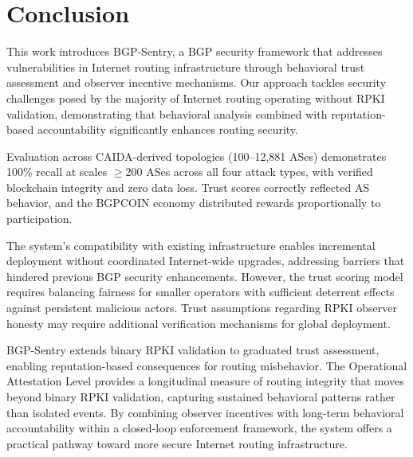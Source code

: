 \section{Conclusion}
\label{sec:conclusion}

This work introduces BGP-Sentry, a BGP security framework that addresses vulnerabilities in Internet routing infrastructure through behavioral trust assessment and observer incentive mechanisms. Our approach tackles security challenges posed by the majority of Internet routing operating without RPKI validation, demonstrating that behavioral analysis combined with reputation-based accountability significantly enhances routing security.

Evaluation across CAIDA-derived topologies (100--12{,}881 ASes) demonstrates 100\% recall at scales $\geq$200 ASes across all four attack types, with verified blockchain integrity and zero data loss. Trust scores correctly reflected AS behavior, and the BGPCOIN economy distributed rewards proportionally to participation.

The system's compatibility with existing infrastructure enables incremental deployment without coordinated Internet-wide upgrades, addressing barriers that hindered previous BGP security enhancements. However, the trust scoring model requires balancing fairness for smaller operators with sufficient deterrent effects against persistent malicious actors. Trust assumptions regarding RPKI observer honesty may require additional verification mechanisms for global deployment.

BGP-Sentry extends binary RPKI validation to graduated trust assessment, enabling reputation-based consequences for routing misbehavior. The Operational Attestation Level provides a longitudinal measure of routing integrity that moves beyond binary RPKI validation, capturing sustained behavioral patterns rather than isolated events. By combining observer incentives with long-term behavioral accountability within a closed-loop enforcement framework, the system offers a practical pathway toward more secure Internet routing infrastructure.
